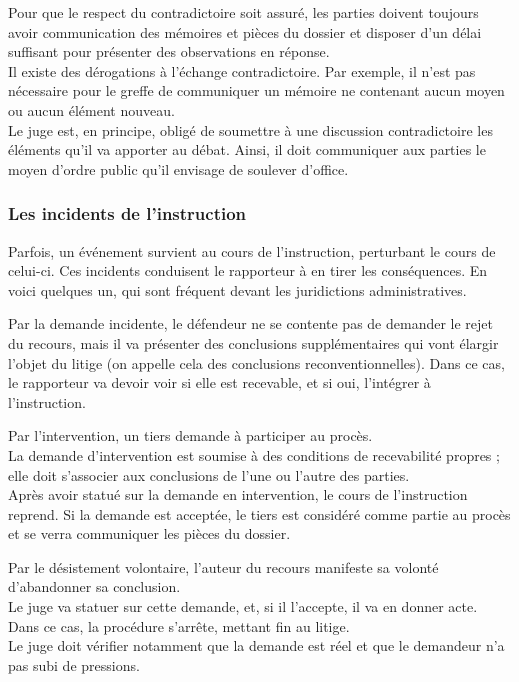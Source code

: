 \documentclass[10pt, a4paper, openany]{book}
\begin{document}
Pour que le respect du contradictoire soit assuré, les parties doivent toujours avoir communication des mémoires et pièces du dossier et disposer d'un délai suffisant pour présenter des observations en réponse. \\
Il existe des dérogations à l'échange contradictoire. Par exemple, il n'est pas nécessaire pour le greffe de communiquer un mémoire ne contenant aucun moyen ou aucun élément nouveau. \\
Le juge est, en principe, obligé de soumettre à une discussion contradictoire les éléments qu'il va apporter au débat. Ainsi, il doit communiquer aux parties le moyen d'ordre public qu'il envisage de soulever d'office. 

\subsubsection{Les incidents de l'instruction}

Parfois, un événement survient  au cours de l'instruction, perturbant le cours de celui-ci. Ces incidents conduisent le rapporteur à en tirer les conséquences. En voici quelques un, qui sont fréquent devant les juridictions administratives. 


Par la demande incidente, le défendeur ne se contente pas de demander le rejet du recours, mais il va présenter des conclusions supplémentaires qui vont élargir l'objet du litige (on appelle cela des conclusions reconventionnelles). Dans ce cas, le rapporteur va devoir voir si elle est recevable, et si oui, l'intégrer à l'instruction. 


Par l'intervention, un tiers demande à participer au procès. \\
La demande d'intervention est soumise à des conditions de recevabilité propres ; elle doit s'associer aux conclusions de l'une ou l'autre des parties. \\
Après avoir statué sur la demande en intervention, le cours de l'instruction reprend. Si la demande est acceptée, le tiers est considéré comme partie au procès et se verra communiquer les pièces du dossier. 


Par le désistement volontaire, l'auteur du recours manifeste sa volonté d'abandonner sa conclusion. \\
Le juge va statuer sur cette demande, et, si il l'accepte, il va en donner acte. Dans ce cas, la procédure s'arrête, mettant fin au litige. \\
Le juge doit vérifier notamment que la demande est réel et que le demandeur n'a pas subi de pressions.
\end{document}
